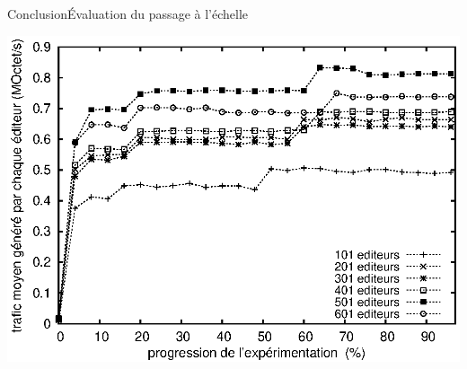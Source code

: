 \begin{frame}{Conclusion}{Évaluation du passage à l'échelle}

  \begin{center}
    \includegraphics[width=1\textwidth]{img/editor/communication.eps}
  \end{center}

\end{frame}



